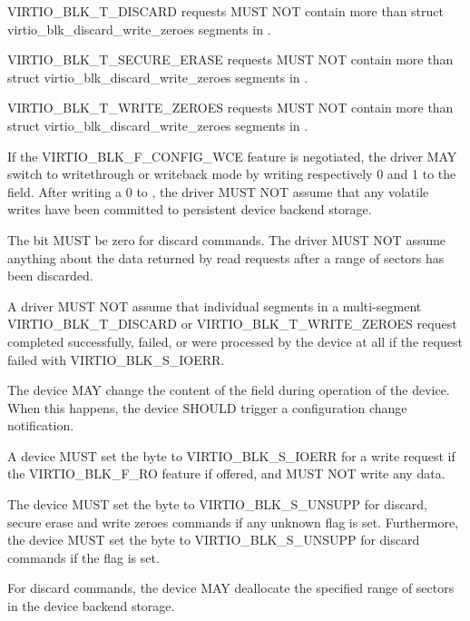 VIRTIO_BLK_T_DISCARD requests MUST NOT contain more than
 struct virtio_blk_discard_write_zeroes segments in
.

VIRTIO_BLK_T_SECURE_ERASE requests MUST NOT contain more than
 struct virtio_blk_discard_write_zeroes segments in
.

VIRTIO_BLK_T_WRITE_ZEROES requests MUST NOT contain more than
 struct virtio_blk_discard_write_zeroes segments in
.

If the VIRTIO_BLK_F_CONFIG_WCE feature is negotiated, the driver MAY
switch to writethrough or writeback mode by writing respectively 0 and
1 to the  field.  After writing a 0 to ,
the driver MUST NOT assume that any volatile writes have been committed
to persistent device backend storage.

The  bit MUST be zero for discard commands.  The driver
MUST NOT assume anything about the data returned by read requests after
a range of sectors has been discarded.

A driver MUST NOT assume that individual segments in a multi-segment
VIRTIO_BLK_T_DISCARD or VIRTIO_BLK_T_WRITE_ZEROES request completed
successfully, failed, or were processed by the device at all if the request
failed with VIRTIO_BLK_S_IOERR.


The device MAY change the content of the  field during
operation of the device. When this happens, the device SHOULD trigger a
configuration change notification.

A device MUST set the  byte to VIRTIO_BLK_S_IOERR
for a write request if the VIRTIO_BLK_F_RO feature if offered, and MUST NOT
write any data.

The device MUST set the  byte to VIRTIO_BLK_S_UNSUPP for
discard, secure erase and write zeroes commands if any unknown flag is set.
Furthermore, the device MUST set the  byte to
VIRTIO_BLK_S_UNSUPP for discard commands if the  flag is set.

For discard commands, the device MAY deallocate the specified range of
sectors in the device backend storage.

